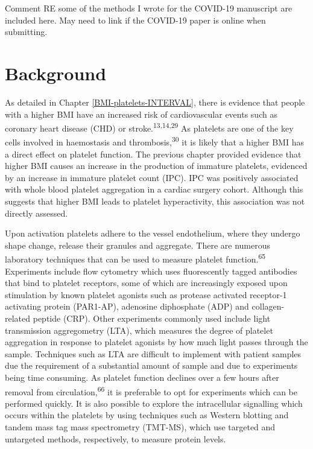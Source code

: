 \documentclass[11pt,twoside]{bristolthesis}
\begin{document}
Comment RE some of the methods I wrote for the COVID-19 manuscript are included here. May need to link if the COVID-19 paper is online when submitting.

\hypertarget{background-2}{%
\section{Background}\label{background-2}}

As detailed in Chapter \ref{BMI-platelets-INTERVAL}, there is evidence that people with a higher BMI have an increased risk of cardiovascular events such as coronary heart disease (CHD) or stroke.\textsuperscript{13,14,29} As platelets are one of the key cells involved in haemostasis and thrombosis,\textsuperscript{30} it is likely that a higher BMI has a direct effect on platelet function. The previous chapter provided evidence that higher BMI causes an increase in the production of immature platelets, evidenced by an increase in immature platelet count (IPC). IPC was positively associated with whole blood platelet aggregation in a cardiac surgery cohort. Although this suggests that higher BMI leads to platelet hyperactivity, this association was not directly assessed.

Upon activation platelets adhere to the vessel endothelium, where they undergo shape change, release their granules and aggregate. There are numerous laboratory techniques that can be used to measure platelet function.\textsuperscript{65} Experiments include flow cytometry which uses fluorescently tagged antibodies that bind to platelet receptors, some of which are increasingly exposed upon stimulation by known platelet agonists such as protease activated receptor-1 activating protein (PAR1-AP), adenosine diphosphate (ADP) and collagen-related peptide (CRP). Other experiments commonly used include light transmission aggregometry (LTA), which measures the degree of platelet aggregation in response to platelet agonists by how much light passes through the sample. Techniques such as LTA are difficult to implement with patient samples due the requirement of a substantial amount of sample and due to experiments being time consuming. As platelet function declines over a few hours after removal from circulation,\textsuperscript{66} it is preferable to opt for experiments which can be performed quickly. It is also possible to explore the intracellular signalling which occurs within the platelets by using techniques such as Western blotting and tandem mass tag mass spectrometry (TMT-MS), which use targeted and untargeted methods, respectively, to measure protein levels.
\end{document}
